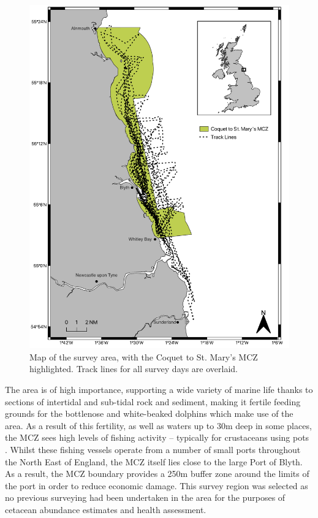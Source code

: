  \begin{figure}
	\begin{center}
		\includegraphics[scale=0.7]{Chapter4/figs/survey_map.pdf}
	\end{center}
	\caption[Map of the survey area, with the Coquet to St. Mary's MCZ highlighted.]{Map of the survey area, with the Coquet to St. Mary's MCZ highlighted. Track lines for all survey days are overlaid.}
	\label{fig:survey-map}
\end{figure}

The area is of high importance, supporting a wide variety of marine life thanks to sections of intertidal and sub-tidal rock and sediment, making it fertile feeding grounds for the bottlenose and white-beaked dolphins which make use of the area. As a result of this fertility, as well as waters up to 30m deep in some places, the MCZ sees high levels of fishing activity -- typically for crustaceans using pots \cite{stephenson_spatial_2017}. Whilst these fishing vessels operate from a number of small ports throughout the North East of England, the MCZ itself lies close to the large Port of Blyth. As a result, the MCZ boundary provides a 250m buffer zone around the limits of the port in order to reduce economic damage. This survey region was selected as no previous surveying had been undertaken in the area for the purposes of cetacean abundance estimates and health assessment.

